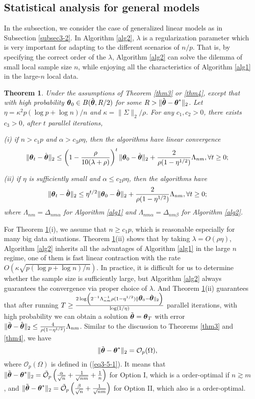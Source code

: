 \documentclass[12pt,a4paper]{article}%
\newtheorem{thm}{Theorem}[section]
\newcommand \vc[1]{{\mbox{\boldmath${#1}$}}}
\newcommand \vtheta{\vc \theta}
\numberwithin{equation}{section}
\newcommand{\sbr}[1]{\left(#1\right)}        %
\begin{document}
\subsection{Statistical analysis for general models}
In the subsection, we consider the case of generalized linear models as in Subsection \ref{subsec3-2}. In Algorithm \ref{alg2}, $\lambda$ is a regularization parameter which is very important for adapting to the different scenarios of $n/p$. That is, by specifying the correct order of the $\lambda$, Algorithm \ref{alg2} can solve the dilemma of small local sample size $n$, while enjoying all the characteristics of Algorithm \ref{alg1} in the large-$n$ local data.

\begin{thm}\label{thm7}
Under the assumptions of Theorem \ref{thm3} or \ref{thm4}, except that with high probability $\vtheta_0\in B(\hat{\vtheta},R/2)$ for some $R>\|\hat{\vtheta}-\vtheta^*\|_2$. Let $\eta=\kappa^2p(\log p+\log n)/n$ and $\kappa=\|\Sigma\|_2/\rho$. For any $c_1, c_2>0$, there exists $c_3>0$, after $t$ parallel iterations,

(i) if $n>c_1p$ and $\alpha>c_3\rho\eta$, then the algorithms have linear convergence
$$\|\vtheta_{t}-\hat{\vtheta}\|_2
\leq \sbr{1-\frac{\rho}{10(\lambda+\rho)}}^t\|\vtheta_{0}-\hat{\vtheta}\|_2+\frac{2}{\rho(1-\eta^{1/2})}\Lambda_{nm}, \forall t\geq0;$$

(ii) if $\eta$ is sufficiently small and $\alpha\leq c_2\rho\eta$, then the algorithms have
$$\|\vtheta_{t}-\hat{\vtheta}\|_2
\leq \eta^{t/2}\|\vtheta_{0}-\hat{\vtheta}\|_2+\frac{2}{\rho(1-\eta^{1/2})}\Lambda_{nm}, \forall t\geq0;$$
where $\Lambda_{nm}=\Delta_{nm\alpha}$ for Algorithm \ref{alg1} and $\Lambda_{nm\alpha}=\Delta_{nm\beta}$ for Algorithm \ref{alg2}.
\end{thm}

For Theorem \ref{thm7}(i), we assume that $n\geq c_1p$, which is reasonable especially for many big data situations. Theorem \ref{thm7}(ii) shows that by taking $\lambda=O(\rho\eta)$, Algorithm \ref{alg2} inherits all the advantages of Algorithm \ref{alg1} in the large $n$ regime, one of them is fast linear contraction with the rate $O(\kappa\sqrt{p(\log p+\log n)/n})$. In practice, it is difficult for us to determine whether the sample size is sufficiently large, but Algorithm \ref{alg2} always guarantees the convergence via proper choice of $\lambda$. And Theorem \ref{thm7}(ii) guarantees that after running $T\geq \frac{2\log\sbr{ 2^{-1}\Lambda_{nm}^{-1}\rho(1-\eta^{1/2})\|\vtheta_0-\hat{\vtheta}\|_2}}{\log (1/\eta)}$ parallel iterations, with high probability we can obtain a solution $\tilde{\vtheta}=\vtheta_T$ with error $\|\tilde{\vtheta}-\hat{\vtheta}\|_2\leq \frac{4}{\rho(1-\eta^{1/2})}\Lambda_{nm}$. Similar to the discussion to Theorems \ref{thm3} and \ref{thm4}, we have $$\|\tilde{\vtheta}-\vtheta^*\|_2=\mathcal{O}_p(\Omega),$$
where $\mathcal{O}_p(\Omega)$ is defined in (\ref{eq3-5-1}). It means that $\|\tilde{\vtheta}-\vtheta^*\|_2=\tilde{\mathcal{O}}_p\sbr{\frac{\alpha}{\sqrt{n}}+\frac{1}{\sqrt{nm}}+\frac{1}{n}}$ for Option I, which is a order-optimal if $n\gtrsim m$, and $\|\tilde{\vtheta}-\vtheta^*\|_2=\mathcal{\tilde{O}}_p\sbr{\frac{\beta}{\sqrt{n}}+\frac{1}{\sqrt{nm}}}$ for Option II, which also is a order-optimal.
\end{document}
